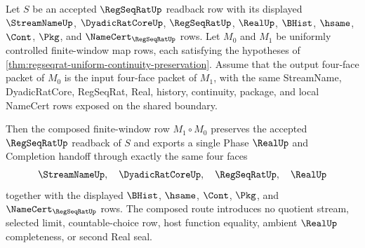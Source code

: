 \begin{theorem}
\label{thm:regseqrat-uniform-continuity-window-modulus-composition}
Let $S$ be an accepted $\RegSeqRatUp$ readback row with its displayed
$\StreamNameUp$, $\DyadicRatCoreUp$, $\RegSeqRatUp$, $\RealUp$, $\BHist$,
$\hsame$, $\Cont$, $\Pkg$, and $\NameCert_{\RegSeqRatUp}$ rows. Let $M_0$ and
$M_1$ be uniformly controlled finite-window map rows, each satisfying the
hypotheses of
\autoref{thm:regseqrat-uniform-continuity-preservation}. Assume that the output
four-face packet of $M_0$ is the input four-face packet of $M_1$, with the same
StreamName, DyadicRatCore, RegSeqRat, Real, history, continuity, package, and
local NameCert rows exposed on the shared boundary.

Then the composed finite-window row $M_1 \circ M_0$ preserves the accepted
$\RegSeqRatUp$ readback of $S$ and exports a single Phase $\RealUp$ and
Completion handoff through exactly the same four faces
$$
\StreamNameUp,\quad \DyadicRatCoreUp,\quad \RegSeqRatUp,\quad \RealUp
$$
together with the displayed $\BHist$, $\hsame$, $\Cont$, $\Pkg$, and
$\NameCert_{\RegSeqRatUp}$ rows. The composed route introduces no quotient
stream, selected limit, countable-choice row, host function equality, ambient
$\RealUp$ completeness, or second Real seal.
\end{theorem}
